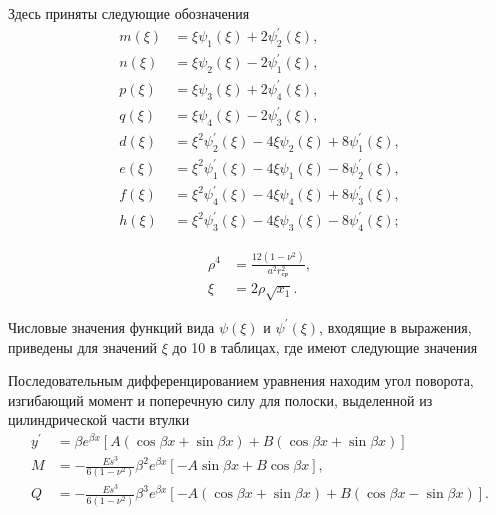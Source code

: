 Здесь приняты следующие обозначения
\begin{equation}
  \label{Timoshenko_eq5}
  \begin{split}
    m(\xi)&=\xi \psi_1(\xi)+2 \psi_2^{\prime}(\xi),\\
    n(\xi)&=\xi \psi_2(\xi)-2 \psi_1^{\prime}(\xi),\\
    p(\xi)&=\xi \psi_3(\xi)+2 \psi_4^{\prime}(\xi),\\
    q(\xi)&=\xi \psi_4(\xi)-2 \psi_3^{\prime}(\xi),\\
    d(\xi)&={\xi}^2 \psi_2^{\prime}(\xi)-4 \xi \psi_2(\xi)+8 \psi_1^{\prime}(\xi),\\
    e(\xi)&={\xi}^2 \psi_1^{\prime}(\xi)-4 \xi \psi_1(\xi)-8 \psi_2^{\prime}(\xi),\\
    f(\xi)&={\xi}^2 \psi_4^{\prime}(\xi)-4 \xi \psi_4(\xi)+8 \psi_3^{\prime}(\xi),\\
    h(\xi)&={\xi}^2 \psi_3^{\prime}(\xi)-4 \xi \psi_3(\xi)-8 \psi_4^{\prime}(\xi);
  \end{split}  
\end{equation}

\begin{equation}
  \label{Timoshenko_eq6}
  \begin{split}
    {\rho}^4&=\frac{12 \left( 1- {\nu}^2 \right)}{a^2 r_{\text{ср}}^2},\\
    \xi&=2 \rho \sqrt{x_1}.
  \end{split}  
\end{equation}

Числовые значения функций вида $\psi (\xi)$ и $\psi^{\prime} (\xi)$, входящие в выражения, приведены для значений $\xi$ до 10 в таблицах, где имеют следующие значения



Последовательным дифференцированием уравнения находим угол поворота, изгибающий момент и поперечную силу для полоски, выделенной из цилиндрической части втулки 
\begin{equation}
  \label{Timoshenko_eq8}
  \begin{split}
    y^{\prime} &=\beta e^{\beta x} \left[ A \left ( \cos{\beta x} + \sin {\beta x} \right )+ B \left ( \cos{\beta x} + \sin {\beta x} \right ) \right]\\
    M &=-\frac{Es^3}{6 \left( 1- {\nu}^2 \right)}{\beta}^2 e^{\beta x} \left[ -A \sin {\beta x}+B \cos{\beta x} \right],\\
    Q &=-\frac{Es^3}{6 \left( 1- {\nu}^2 \right)}{\beta}^3 e^{\beta x} \left[ -A \left (\cos{\beta x}+\sin {\beta x}\right ) +B \left (\cos{\beta x}-\sin {\beta x}\right ) \right].
  \end{split}  
\end{equation}

